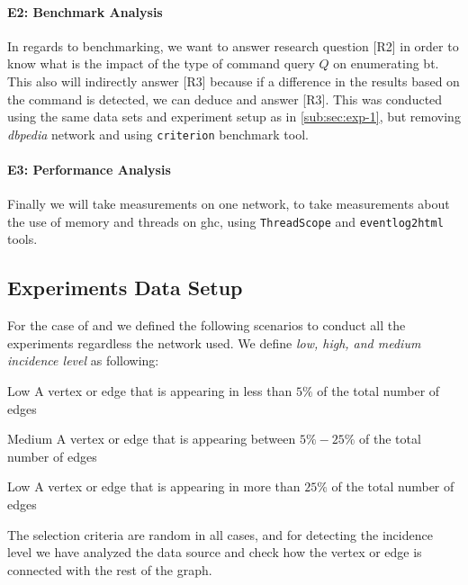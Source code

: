 \paragraph{E2: Benchmark Analysis}\label{sub:sec:exp-2} In regards to benchmarking, we want to answer research question [R2] in order to know what is the impact of the type of command query $Q$ on enumerating \acrshort{bt}.
This also will indirectly answer [R3] because if a difference in the results based on the command is detected, we can deduce and answer [R3]. This was conducted using the same data sets and 
experiment setup as in \autoref{sub:sec:exp-1}, but removing \emph{\acrshort{dbpedia}} network and using \texttt{criterion} \cite{criterion} benchmark tool.

\paragraph{E3: Performance Analysis}\label{sub:sec:exp-3} Finally we will take measurements on one network, to take measurements about the use of memory and threads on \acrshort{ghc}, using
\texttt{ThreadScope} \cite{threadscope} and \texttt{eventlog2html} \cite{eventlog2html} tools. 

\subsection{Experiments Data Setup}\label{sub:exp:exp-data-setup}
For the case of  and  we defined the following scenarios to conduct all the experiments regardless the network used.
We define \emph{low, high, and medium incidence level} as following:
\begin{inparaenum}
  \item[Low] A vertex or edge that is appearing in less than $5\%$ of the total number of edges
  \item[Medium] A vertex or edge that is appearing between $5\%-25\%$ of the total number of edges
  \item[Low] A vertex or edge that is appearing in more than $25\%$ of the total number of edges
\end{inparaenum}
The selection criteria are random in all cases, and for detecting the incidence level we have analyzed the data source and check how the vertex or edge is connected with the rest of the graph.

